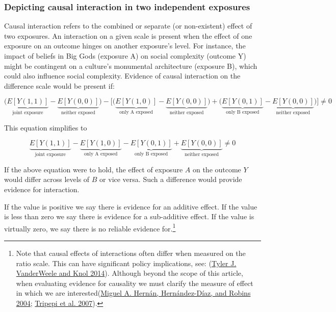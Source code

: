 \documentclass[
  singlecolumn]{report}
\begin{document}
\hypertarget{depicting-causal-interaction-in-two-independent-exposures}{%
\subsubsection{\texorpdfstring{\textbf{Depicting causal interaction in
two independent
exposures}}{Depicting causal interaction in two independent exposures}}\label{depicting-causal-interaction-in-two-independent-exposures}}

Causal interaction refers to the combined or separate (or non-existent)
effect of two exposures. An interaction on a given scale is present when
the effect of one exposure on an outcome hinges on another exposure's
level. For instance, the impact of beliefs in Big Gods (exposure A) on
social complexity (outcome Y) might be contingent on a culture's
monumental architecture (exposure B), which could also influence social
complexity. Evidence of causal interaction on the difference scale would
be present if:

\[\bigg(\underbrace{E[Y(1,1)]}_{\text{joint exposure}} - \underbrace{E[Y(0,0)]}_{\text{neither exposed}}\bigg) - \bigg[ \bigg(\underbrace{E[Y(1,0)]}_{\text{only A exposed}} - \underbrace{E[Y(0,0)]}_{\text{neither exposed}}\bigg) + \bigg(\underbrace{E[Y(0,1)]}_{\text{only B exposed}} - \underbrace{E[Y(0,0)]}_{\text{neither exposed}} \bigg)\bigg] \neq 0 \]

This equation simplifies to

\[ \underbrace{E[Y(1,1)]}_{\text{joint exposure}} - \underbrace{E[Y(1,0)]}_{\text{only A exposed}} - \underbrace{E[Y(0,1)]}_{\text{only B exposed}} + \underbrace{E[Y(0,0)]}_{\text{neither exposed}} \neq 0 \]

If the above equation were to hold, the effect of exposure \(A\) on the
outcome \(Y\) would differ across levels of \(B\) or vice versa. Such a
difference would provide evidence for interaction.

If the value is positive we say there is evidence for an additive
effect. If the value is less than zero we say there is evidence for a
sub-additive effect. If the value is virtually zero, we say there is no
reliable evidence for.\footnote{Note that causal effects of interactions
  often differ when measured on the ratio scale. This can have
  significant policy implications, see:
  (\protect\hyperlink{ref-vanderweele2014}{Tyler J. VanderWeele and Knol
  2014}). Although beyond the scope of this article, when evaluating
  evidence for causality we must clarify the measure of effect in which
  we are interested(\protect\hyperlink{ref-hernuxe1n2004}{Miguel A.
  Hernán, Hernández-Díaz, and Robins 2004};
  \protect\hyperlink{ref-tripepi2007}{Tripepi et al. 2007}).}
\end{document}
